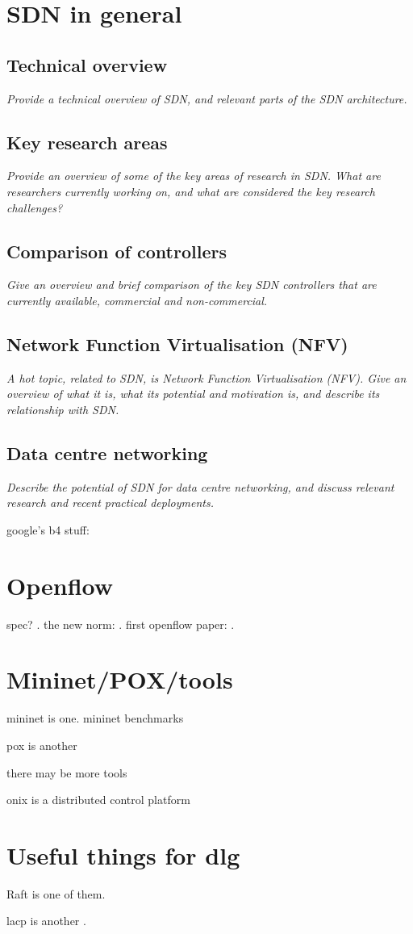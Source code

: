 \documentclass[pdftex,12pt,a4paper]{article}
\begin{document}
\section{SDN in general}
\subsection{Technical overview}
\emph{Provide a technical overview of SDN, and relevant parts of the SDN architecture.}

\subsection{Key research areas}
\emph{Provide an overview of some of the key areas of research in SDN. What are researchers currently working on, and what are considered the key research challenges?}

\subsection{Comparison of controllers}
\emph{Give an overview and brief comparison of the key SDN controllers that are currently available, commercial and non-commercial.}

\subsection{Network Function Virtualisation (NFV)}
\emph{A hot topic, related to SDN, is Network Function Virtualisation (NFV). Give an overview of what it is, what its potential and motivation is, and describe its relationship with SDN.}

\subsection{Data centre networking}
\emph{Describe the potential of SDN for data centre networking, and discuss relevant research and recent practical deployments.}

google's b4 stuff: \cite{jain:b4}

\section{Openflow}
spec? \cite{onf:switch}. the new norm: \cite{onf:norm}. first openflow paper: \cite{mckeown:campus}.

\section{Mininet/POX/tools}
mininet is one. mininet benchmarks \cite{handigol:mininet}

pox is another

there may be more tools

onix \cite{koponen:onix} is a distributed control platform

\section{Useful things for dlg}
Raft \cite{ongaro:raft} is one of them.

lacp is another \cite{ieee:lacp}.

\newpage


\end{document}
